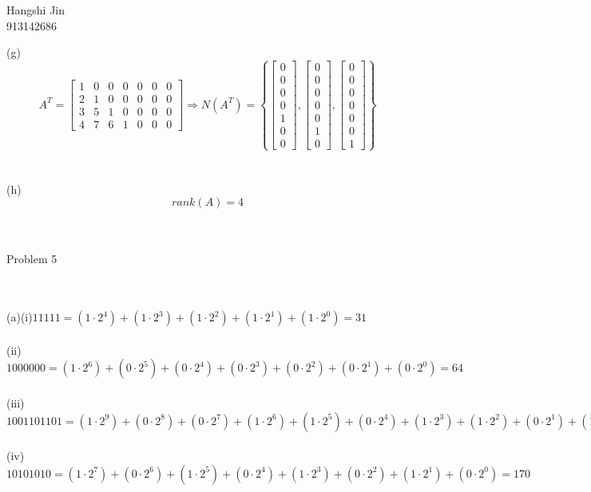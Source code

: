 \documentclass{article}
\begin{document}
\begin{flushright}Hangshi Jin\\913142686\end{flushright}
(g)\[A^T=\begin{bmatrix}
1&0&0&0&0&0&0\\
2&1&0&0&0&0&0\\
3&5&1&0&0&0&0\\
4&7&6&1&0&0&0	
\end{bmatrix}\Rightarrow N(A^T)=\left\{\begin{bmatrix}0\\0\\0\\0\\1\\0\\0\end{bmatrix},\begin{bmatrix}0\\0\\0\\0\\0\\1\\0\end{bmatrix},\begin{bmatrix}0\\0\\0\\0\\0\\0\\1\end{bmatrix}\right\}\]
\\\\(h)\[rank(A)=4\]
\\\\\begin{large}Problem 5\end{large}
\\\\(a)(i)$11111 = (1 \cdot 2^4) + (1 \cdot 2^3) + (1 \cdot 2^2) + (1 \cdot 2^1) + (1 \cdot 2^0) = 31$
\\\\(ii)$1000000 = (1 \cdot 2^6) + (0 \cdot 2^5) + (0 \cdot 2^4) + (0 \cdot 2^3) + (0 \cdot 2^2) + (0 \cdot 2^1) + (0 \cdot 2^0) = 64$
\\\\(iii)$1001101101 = (1 \cdot 2^9) + (0 \cdot 2^8) + (0 \cdot 2^7) + (1 \cdot 2^6) + (1 \cdot 2^5) + (0 \cdot 2^4) + (1 \cdot 2^3) + (1 \cdot 2^2) + (0 \cdot 2^1) + (1 \cdot 2^0) = 621$
\\\\(iv)$10101010 = (1 \cdot 2^7) + (0 \cdot 2^6) + (1 \cdot 2^5) + (0 \cdot 2^4) + (1 \cdot 2^3) + (0 \cdot 2^2) + (1 \cdot 2^1) + (0 \cdot 2^0) = 170$
\end{document}
